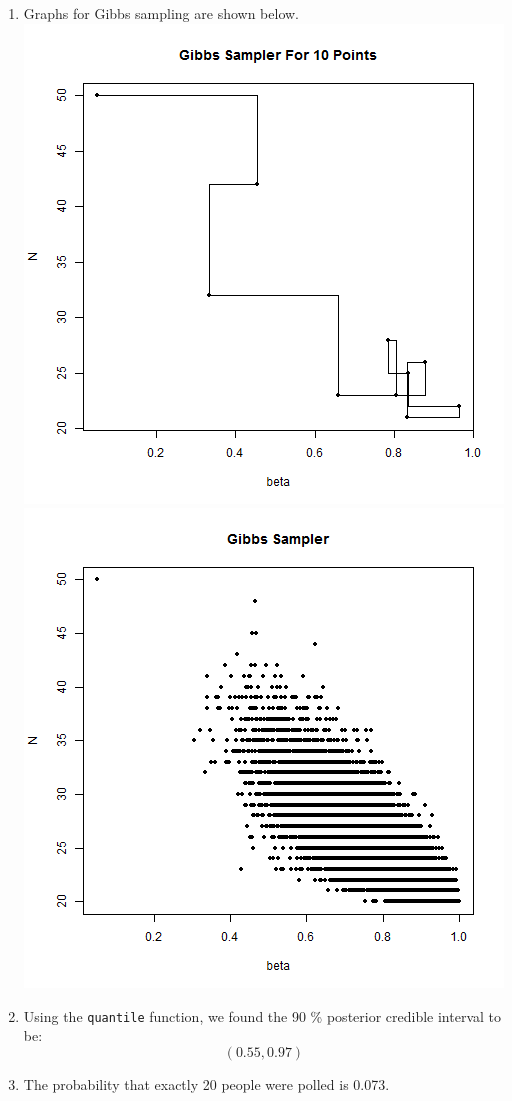 \documentclass{article}
\begin{document}
\begin{enumerate}
\item Graphs for Gibbs sampling are shown below. \\
\includegraphics[scale = 0.45]{gibb10.png}
\includegraphics[scale=0.45]{gibb.png}

\item Using the \texttt{quantile} function, we found the 90 \% posterior credible interval to be:
$$(0.55,0.97)$$

\item The probability that exactly 20 people were polled is 0.073.


\end{enumerate}
\pagebreak
{}
\end{document}

